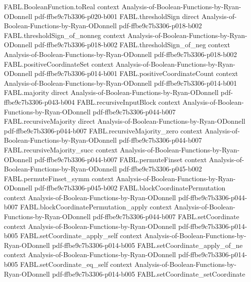 \begin{theorem}
  {FABL.BooleanFunction.toReal}
  {context}
  {Analysis-of-Boolean-Functions-by-Ryan-ODonnell}
  {pdf-ffbe9c7b3306-p020-b001}
\proofstep
  {FABL.thresholdSign}
  {direct}
  {Analysis-of-Boolean-Functions-by-Ryan-ODonnell}
  {pdf-ffbe9c7b3306-p018-b002}
\proofstep
  {FABL.thresholdSign_of_nonneg}
  {context}
  {Analysis-of-Boolean-Functions-by-Ryan-ODonnell}
  {pdf-ffbe9c7b3306-p018-b002}
\proofstep
  {FABL.thresholdSign_of_neg}
  {context}
  {Analysis-of-Boolean-Functions-by-Ryan-ODonnell}
  {pdf-ffbe9c7b3306-p018-b002}
\proofstep
  {FABL.positiveCoordinateSet}
  {context}
  {Analysis-of-Boolean-Functions-by-Ryan-ODonnell}
  {pdf-ffbe9c7b3306-p014-b001}
\proofstep
  {FABL.positiveCoordinateCount}
  {context}
  {Analysis-of-Boolean-Functions-by-Ryan-ODonnell}
  {pdf-ffbe9c7b3306-p014-b001}
\proofstep
  {FABL.majority}
  {direct}
  {Analysis-of-Boolean-Functions-by-Ryan-ODonnell}
  {pdf-ffbe9c7b3306-p043-b004}
\proofstep
  {FABL.recursiveInputBlock}
  {context}
  {Analysis-of-Boolean-Functions-by-Ryan-ODonnell}
  {pdf-ffbe9c7b3306-p044-b007}
\proofstep
  {FABL.recursiveMajority}
  {direct}
  {Analysis-of-Boolean-Functions-by-Ryan-ODonnell}
  {pdf-ffbe9c7b3306-p044-b007}
\proofstep
  {FABL.recursiveMajority_zero}
  {context}
  {Analysis-of-Boolean-Functions-by-Ryan-ODonnell}
  {pdf-ffbe9c7b3306-p044-b007}
\proofstep
  {FABL.recursiveMajority_succ}
  {context}
  {Analysis-of-Boolean-Functions-by-Ryan-ODonnell}
  {pdf-ffbe9c7b3306-p044-b007}
\proofstep
  {FABL.permuteFinset}
  {context}
  {Analysis-of-Boolean-Functions-by-Ryan-ODonnell}
  {pdf-ffbe9c7b3306-p045-b002}
\proofstep
  {FABL.permuteFinset_symm}
  {context}
  {Analysis-of-Boolean-Functions-by-Ryan-ODonnell}
  {pdf-ffbe9c7b3306-p045-b002}
\proofstep
  {FABL.blockCoordinatePermutation}
  {context}
  {Analysis-of-Boolean-Functions-by-Ryan-ODonnell}
  {pdf-ffbe9c7b3306-p044-b007}
\proofstep
  {FABL.blockCoordinatePermutation_apply}
  {context}
  {Analysis-of-Boolean-Functions-by-Ryan-ODonnell}
  {pdf-ffbe9c7b3306-p044-b007}
\proofstep
  {FABL.setCoordinate}
  {context}
  {Analysis-of-Boolean-Functions-by-Ryan-ODonnell}
  {pdf-ffbe9c7b3306-p014-b005}
\proofstep
  {FABL.setCoordinate_apply_self}
  {context}
  {Analysis-of-Boolean-Functions-by-Ryan-ODonnell}
  {pdf-ffbe9c7b3306-p014-b005}
\proofstep
  {FABL.setCoordinate_apply_of_ne}
  {context}
  {Analysis-of-Boolean-Functions-by-Ryan-ODonnell}
  {pdf-ffbe9c7b3306-p014-b005}
\proofstep
  {FABL.setCoordinate_eq_self}
  {context}
  {Analysis-of-Boolean-Functions-by-Ryan-ODonnell}
  {pdf-ffbe9c7b3306-p014-b005}
\proofstep
  {FABL.setCoordinate_setCoordinate}

\end{theorem}
